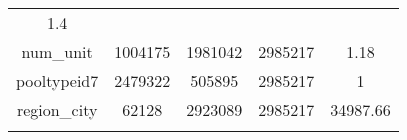 \documentclass[]{book}
\theoremstyle{definition}
\theoremstyle{definition}
\theoremstyle{definition}
\theoremstyle{remark}
\begin{document}
\begin{longtable}[]{@{}ccccc@{}}
\begin{minipage}[t]{0.12\columnwidth}
1.4\strut
\end{minipage}\tabularnewline
\begin{minipage}[t]{0.35\columnwidth}\centering\strut
num\_unit\strut
\end{minipage} & \begin{minipage}[t]{0.12\columnwidth}\centering\strut
1004175\strut
\end{minipage} & \begin{minipage}[t]{0.13\columnwidth}\centering\strut
1981042\strut
\end{minipage} & \begin{minipage}[t]{0.12\columnwidth}\centering\strut
2985217\strut
\end{minipage} & \begin{minipage}[t]{0.12\columnwidth}\centering\strut
1.18\strut
\end{minipage}\tabularnewline
\begin{minipage}[t]{0.35\columnwidth}\centering\strut
pooltypeid7\strut
\end{minipage} & \begin{minipage}[t]{0.12\columnwidth}\centering\strut
2479322\strut
\end{minipage} & \begin{minipage}[t]{0.13\columnwidth}\centering\strut
505895\strut
\end{minipage} & \begin{minipage}[t]{0.12\columnwidth}\centering\strut
2985217\strut
\end{minipage} & \begin{minipage}[t]{0.12\columnwidth}\centering\strut
1\strut
\end{minipage}\tabularnewline
\begin{minipage}[t]{0.35\columnwidth}\centering\strut
region\_city\strut
\end{minipage} & \begin{minipage}[t]{0.12\columnwidth}\centering\strut
62128\strut
\end{minipage} & \begin{minipage}[t]{0.13\columnwidth}\centering\strut
2923089\strut
\end{minipage} & \begin{minipage}[t]{0.12\columnwidth}\centering\strut
2985217\strut
\end{minipage} & \begin{minipage}[t]{0.12\columnwidth}\centering\strut
34987.66\strut
\end{minipage}\tabularnewline
\begin{minipage}[t]{0.35\columnwidth}\centering\strut

\end{minipage}
\end{longtable}
\end{document}
